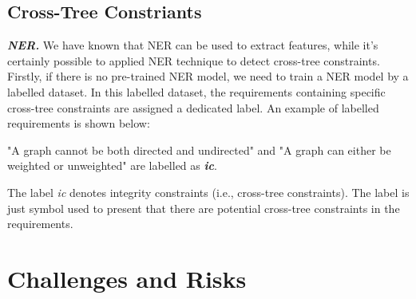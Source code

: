 \documentclass[graybox]{svmult}
\begin{document}

\subsection{Cross-Tree Constriants}

\textit{\textbf{NER.}} We have known that NER can be used to extract features, while it's certainly possible to applied NER technique to detect cross-tree constraints. Firstly, if there is no pre-trained NER model, we need to train a NER model by a labelled dataset. In this labelled dataset, the requirements containing specific cross-tree constraints are assigned a dedicated label. An example of labelled requirements \cite{BagheriEG12} is shown below:

\begin{shaded}
"A graph cannot be both directed and undirected" and "A graph can either be weighted or unweighted" are labelled as \textit{\textbf{ic}}.
\end{shaded}
The label \textit{ic} denotes integrity constraints (i.e., cross-tree constraints). The label is just symbol used to present that there are potential cross-tree constraints in the requirements.



\section{Challenges and Risks}
\label{sec:challenge}




 
\end{document}
